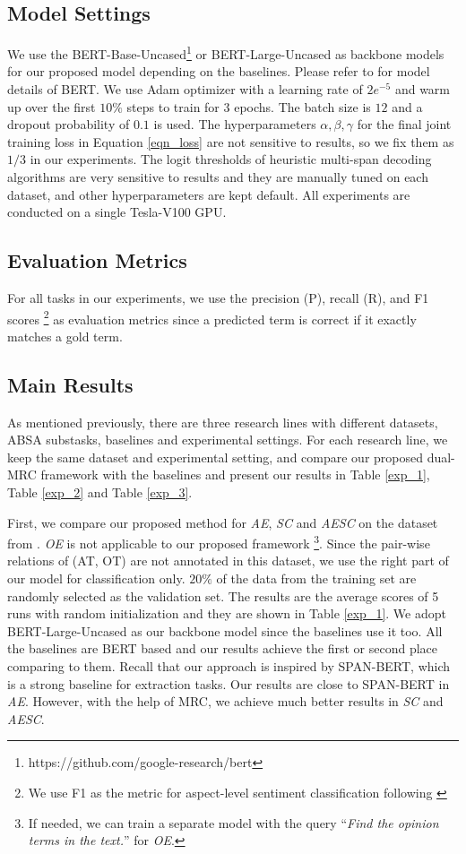 \documentclass[letterpaper]{article} \usepackage{aaai21}  \usepackage{times}  \usepackage{helvet} \usepackage{courier}  \usepackage[hyphens]{url}  \usepackage{graphicx} \urlstyle{rm} \def\UrlFont{\rm}  \usepackage{natbib}  \usepackage{caption}
\begin{document}
\subsection{Model Settings}
We use the BERT-Base-Uncased\footnote{https://github.com/google-research/bert} or BERT-Large-Uncased
as backbone models for our proposed model depending on the baselines. 
Please refer to \cite{devlin2019bert} for model details of BERT.
We use Adam optimizer with a learning rate of $2e^{-5}$ and warm up over the first $10\%$ steps to train for 3 epochs. 
The batch size is $12$ and a dropout probability of $0.1$ is used. 
The hyperparameters $\alpha, \beta, \gamma$ for the final joint training loss in Equation \ref{eqn_loss} are not sensitive to results, so we fix them as $1/3$ in our experiments.
The logit thresholds of heuristic multi-span decoding algorithms \cite{hu-etal-2019-open} are very sensitive to results and they are manually tuned on each dataset, and other hyperparameters are kept default. All experiments are conducted on a single Tesla-V100 GPU.


\subsection{Evaluation Metrics}
For all tasks in our experiments, we use the precision (P), recall (R), and F1 scores
\footnote{We use F1 as the metric for aspect-level sentiment classification following \cite{chen-qian-2020-relation}} as evaluation metrics since
a predicted term is correct if it exactly matches a gold term. 



\subsection{Main Results}
As mentioned previously, there are three research lines with different datasets, ABSA substasks, baselines and experimental settings. 
For each research line, we keep the same dataset and experimental setting, and compare our proposed dual-MRC framework with the baselines and present our results in Table \ref{exp_1}, Table \ref{exp_2} and Table \ref{exp_3}.

First, we compare our proposed method for \emph{AE}, \emph{SC} and \emph{AESC} on the dataset from \cite{DBLP:conf/aaai/WangPDX17}. 
\emph{OE} is not applicable to our proposed framework
\footnote{If needed, we can train a separate model with the query ``\emph{Find the opinion terms in the text.}'' for \emph{OE}.}. 
Since the pair-wise relations of (AT, OT) are not annotated in this dataset, we use the right part of our model for classification only. 
$20\%$ of the data from the training set are randomly selected as the validation set. 
The results are the average scores of 5 runs with random initialization and they are shown in Table \ref{exp_1}. 
We adopt BERT-Large-Uncased as our backbone model since the baselines use it too.
All the baselines are BERT based and our results achieve the first or second place comparing to them. 
Recall that our approach is inspired by SPAN-BERT, which is a strong baseline for extraction tasks.
Our results are close to SPAN-BERT in \emph{AE}.
However, with the help of MRC, we achieve much better results in \emph{SC} and \emph{AESC}. 
\end{document}
